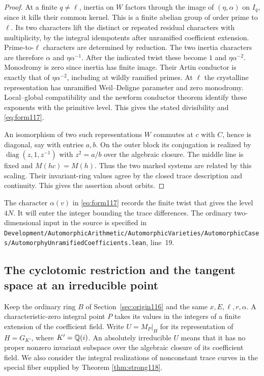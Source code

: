 \documentclass[a4paper,11pt]{article}
\theoremstyle{definition}
\theoremstyle{remark}
\newcommand{\srcloc}[2]{{\small\nolinkurl{#1.lean}}, line~#2}
\numberwithin{equation}{section}
\begin{document}
\begin{proof}
At a finite \(q\ne\ell\), inertia on \(W\) factors through the
image of \((\eta,\alpha)\) on \(I_q\), since it kills their common
kernel. This is a finite abelian group of order prime to \(\ell\).
Its two characters lift the distinct or repeated residual
characters with multiplicity, by the integral idempotents after
unramified coefficient extension. Prime-to-\(\ell\) characters
are determined by reduction. The two inertia characters are
therefore \(\alpha\) and \(\eta\alpha^{-1}\). After the indicated
twist these become \(1\) and \(\eta\alpha^{-2}\). Monodromy is
zero since inertia has finite image. Their Artin conductor is
exactly that of \(\eta\alpha^{-2}\), including at wildly
ramified primes. At \(\ell\) the crystalline representation has
unramified Weil--Deligne parameter and zero monodromy. Local--global
compatibility and the newform conductor theorem identify these
exponents with the primitive level. This gives the stated
divisibility and \eqref{eq:form117}.~\cite{VI-IV-VI-carayol117,VI-IV-VI-saito40}

An isomorphism of two such representations \(W\) commutes at
\(c\) with \(C\), hence is diagonal, say with entries \(a,b\).
On the outer block its conjugation is realized by
\(\operatorname{diag}(z,1,z^{-1})\) with \(z^2=a/b\) over the
algebraic closure. The middle line is fixed and \(M(hc)=M(h)\).
Thus the two marked systems are related by this scaling. Their
invariant-ring values agree by the closed trace description and
continuity. This gives the assertion about orbits.
\end{proof}

The character \(\alpha(v)\) in \eqref{eq:form117} records the
finite twist that gives the level \(4N\). It will enter the
integer bounding the trace differences. The ordinary
two-dimensional input in the source is specified in
\srcloc{Development/AutomorphicArithmetic/AutomorphicVarieties/AutomorphicCases/AutomorphyUnramifiedCoefficients}{19}.

\subsection{The cyclotomic restriction and the tangent space at an irreducible point}\label{nav:IV-19}
\label{sec:cyclo119}

Keep the ordinary ring \(B\) of Section~\ref{sec:origin116} and
the same \(x,E,\ell,r,\alpha\). A characteristic-zero integral
point \(P\) takes its values in the integers of a finite extension
of the coefficient field. Write \(U=M_P|_H\) for its
representation of \(H=G_{K'}\), where \(K'=\mathbb Q(i)\). An
absolutely irreducible \(U\) means that it has no proper
nonzero invariant subspace over the algebraic closure of its
coefficient field. We also consider the integral realizations
of nonconstant trace curves in the special fiber supplied by
Theorem \ref{thm:strong118}.
\end{document}
